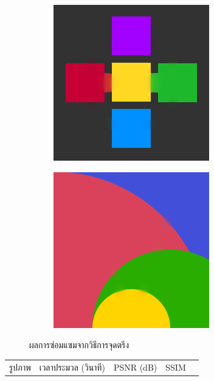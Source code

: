 \documentclass[hidelinks, a4paper,12pt]{article}
\numberwithin{equation}{section}							%
\numberwithin{equation}{section}
\begin{document}
{\begin{figure}[H]
\begin{subfigure}{0.4\linewidth}
		\includegraphics[width=0.8\linewidth]{images/result_ex1/fixpoint04.png}			
	\end{subfigure}
	\begin{subfigure}{0.4\linewidth}
		\centering
		\includegraphics[width=0.8\linewidth]{images/result_ex1/fixpoint05.png}			
	\end{subfigure}
	\caption{ผลการซ่อมแซมจากวิธีการจุดตรึง}
\end{figure}
\begin{table}[H]
	\centering
	\begin{tabular}[ht]{|c|c|c|c|c|}
		\hline
		รูปภาพ &เวลาประมวล  (วินาที) & PSNR (dB) & SSIM \\

\end{tabular}
\end{table}}
\end{document}
